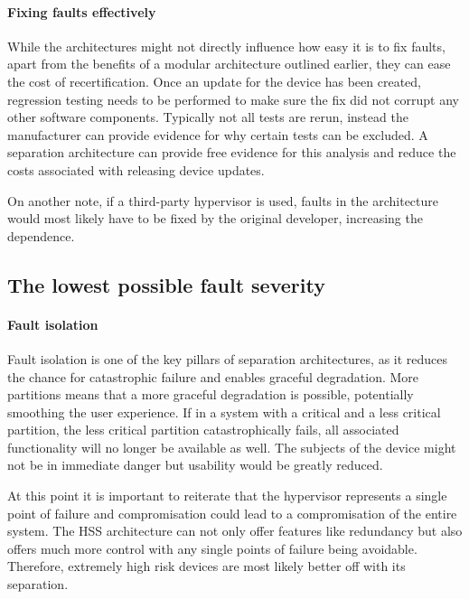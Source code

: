 \paragraph{Fixing faults effectively} \label{effective-fault-fixing}
While the architectures might not directly influence how easy it is to fix faults, apart from the benefits of a modular architecture outlined earlier, they can ease the cost of recertification. Once an update for the device has been created, regression testing needs to be performed to make sure the fix did not corrupt any other software components. Typically not all tests are rerun, instead the manufacturer can provide evidence for why certain tests can be excluded. A separation architecture can provide free evidence for this analysis and reduce the costs associated with releasing device updates.

On another note, if a third-party hypervisor is used, faults in the architecture would most likely have to be fixed by the original developer, increasing the dependence.

\subsection{The lowest possible fault severity}
\paragraph{Fault isolation}
Fault isolation is one of the key pillars of separation architectures, as it reduces the chance for catastrophic failure and enables graceful degradation. More partitions means that a more graceful degradation is possible, potentially smoothing the user experience. If in a system with a critical and a less critical partition, the less critical partition catastrophically fails, all associated functionality will no longer be available as well. The subjects of the device might not be in immediate danger but usability would be greatly reduced.

At this point it is important to reiterate that the hypervisor represents a single point of failure and compromisation could lead to a compromisation of the entire system. The \gls{HSS} architecture can not only offer features like redundancy but also offers much more control with any single points of failure being avoidable. Therefore, extremely high risk devices are most likely better off with its separation.

